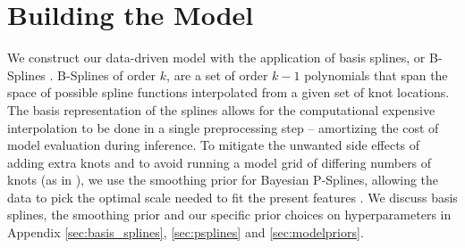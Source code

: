 \section{Building the Model} \label{sec:methods}

We construct our data-driven model with the application of basis splines, or B-Splines \citep{deBoor78}. B-Splines of order $k$, are a set of order $k-1$ polynomials that 
span the space of possible spline functions interpolated from a given set of knot locations. The basis representation of the splines allows for the computational 
expensive interpolation to be done in a single preprocessing step -- amortizing the cost of model evaluation during inference. To mitigate the unwanted side effects of 
adding extra knots and to avoid running a model grid of differing numbers of knots (as in \citet{Edelman_2022ApJ}), we use the smoothing prior for Bayesian P-Splines, 
allowing the data to pick the optimal scale needed to fit the present features \citep{eilers2021practical,BayesianPSplines,Jullion2007RobustSO}. We discuss basis splines, the smoothing prior 
and our specific prior choices on hyperparameters in Appendix \ref{sec:basis_splines}, \ref{sec:psplines} and \ref{sec:modelpriors}. 

